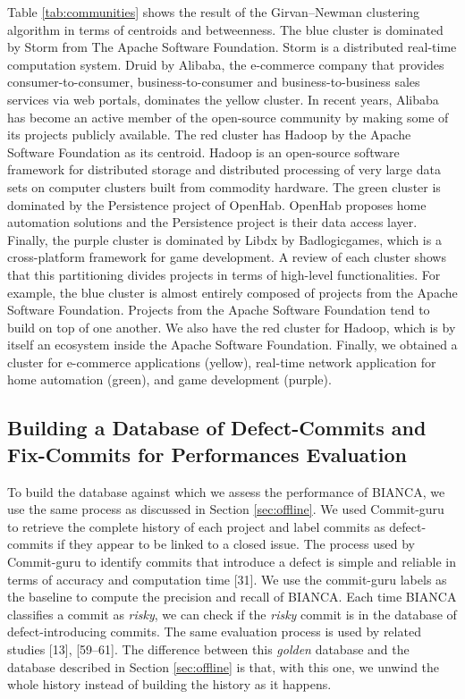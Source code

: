 \documentclass[conference]{IEEEtran}
\begin{document}
Table \ref{tab:communities} shows the result of the Girvan--Newman
clustering algorithm in terms of centroids and betweenness. The blue
cluster is dominated by Storm from The Apache Software Foundation. Storm
is a distributed real-time computation system. Druid by Alibaba, the
e-commerce company that provides consumer-to-consumer,
business-to-consumer and business-to-business sales services via web
portals, dominates the yellow cluster. In recent years, Alibaba has
become an active member of the open-source community by making some of
its projects publicly available. The red cluster has Hadoop by the
Apache Software Foundation as its centroid. Hadoop is an open-source
software framework for distributed storage and distributed processing of
very large data sets on computer clusters built from commodity hardware.
The green cluster is dominated by the Persistence project of OpenHab.
OpenHab proposes home automation solutions and the Persistence project
is their data access layer. Finally, the purple cluster is dominated by
Libdx by Badlogicgames, which is a cross-platform framework for game
development.
A review of each cluster shows that this partitioning divides projects
in terms of high-level functionalities. For example, the blue cluster is
almost entirely composed of projects from the Apache Software
Foundation. Projects from the Apache Software Foundation tend to build
on top of one another. We also have the red cluster for Hadoop, which is
by itself an ecosystem inside the Apache Software Foundation. Finally,
we obtained a cluster for e-commerce applications (yellow), real-time
network application for home automation (green), and game development
(purple).



\subsection{Building a Database of Defect-Commits and Fix-Commits for
Performances Evaluation}\label{sub:golden}

To build the database against which we assess the performance of BIANCA,
we use the same process as discussed in Section \ref{sec:offline}. We
used Commit-guru to retrieve the complete history of each project and
label commits as defect-commits if they appear to be linked to a closed
issue. The process used by Commit-guru to identify commits that
introduce a defect is simple and reliable in terms of accuracy and
computation time {[}31{]}. We use the commit-guru labels as the baseline
to compute the precision and recall of BIANCA. Each time BIANCA
classifies a commit as \emph{risky}, we can check if the \emph{risky}
commit is in the database of defect-introducing commits. The same
evaluation process is used by related studies {[}13{]}, {[}59--61{]}.
The difference between this \emph{golden} database and the database
described in Section \ref{sec:offline} is that, with this one, we unwind
the whole history instead of building the history as it happens.
\end{document}
